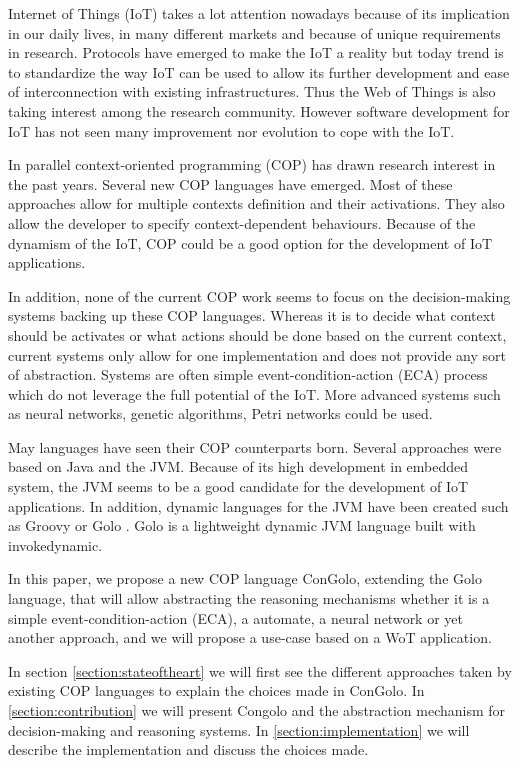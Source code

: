 \documentclass[a4paper]{article}
\begin{document}
Internet of Things (IoT) takes a lot attention nowadays because of its implication in our daily lives, in many different markets and because of unique requirements in research. Protocols have emerged to make the IoT a reality but today trend is to standardize the way IoT can be used to allow its further development and ease of interconnection with existing infrastructures. Thus the Web of Things is also taking interest among the research community. However software development for IoT has not seen many improvement nor evolution to cope with the IoT.

In parallel context-oriented programming (COP) has drawn research interest in the past years. Several new COP languages have emerged. Most of these approaches allow for multiple contexts definition and their activations. They also allow the developer to specify context-dependent behaviours. Because of the dynamism of the IoT, COP could be a good option for the development of IoT applications.

In addition, none of the current COP work seems to focus on the decision-making systems backing up these COP languages. Whereas it is to decide what context should be activates or what actions should be done based on the current context, current systems only allow for one implementation and does not provide any sort of abstraction. Systems are often simple event-condition-action (ECA) process which do not leverage the full potential of the IoT. More advanced systems such as neural networks, genetic algorithms, Petri networks could be used.


May languages have seen their COP counterparts born. Several approaches were based on Java and the JVM. Because of its high development in embedded system, the JVM seems to be a good candidate for the development of IoT applications. In addition, dynamic languages for the JVM have been created such as Groovy or Golo \cite{ponge_golo_2013}. Golo is a lightweight dynamic JVM language built with invokedynamic.

In this paper, we propose a new COP language ConGolo, extending the Golo language, that will allow abstracting the reasoning mechanisms whether it is a simple event-condition-action (ECA), a automate, a neural network or yet another approach, and we will propose a use-case based on a WoT application.


In section \ref{section:stateoftheart} we will first see the different approaches taken by existing COP languages to explain the choices made in ConGolo. In \ref{section:contribution} we will present Congolo and the abstraction mechanism for decision-making and reasoning systems. In \ref{section:implementation} we will describe the implementation and discuss the choices made.
\end{document}
